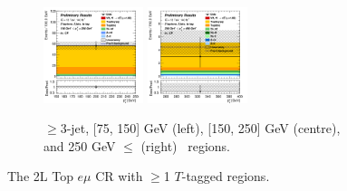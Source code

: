 \begin{figure}[h!]
\begin{subfigure}[b]{\textwidth}
        \includegraphics[width=0.32\textwidth]{Images/VH/Own_fit/postfit_VHcc/Region_distpTV_BMax250_BMin150_Dtopemucr_J3_TTypeta_T2_L2_Y6051_GlobalFit_conditionnal_mu1.png}
        \includegraphics[width=0.32\textwidth]{Images/VH/Own_fit/postfit_VHcc/Region_distpTV_BMax400_BMin250_Dtopemucr_J3_TTypeta_T2_L2_Y6051_GlobalFit_conditionnal_mu1.png}
        \caption{$\geq$3-jet, [75, 150] GeV (left), [150, 250] GeV (centre), and 250  GeV $\leq$ (right) \ptv\ regions.}
        \label{fig:plots_VHcc_2L_topCRemu_3J}
    \end{subfigure}
    \caption{The 2L Top $e\mu$ CR with $\geq$1 $T$-tagged regions.}
    \label{fig:plots_VHcc_2L_topCRemu}
\end{figure}

